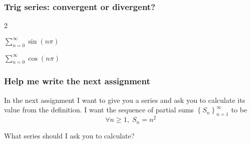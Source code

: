 \documentclass[14pt]{beamer}
\begin{document}
	\begin{frame}[t]
		\frametitle{Trig series: convergent or divergent?}

		\begin{enumerate}
		\end{enumerate}
	\end{frame}

	\begin{frame}[t]
		\frametitle{Help me write the next assignment}

		In the next assignment I want to give you a series and ask you to calculate
		its value from the definition. I want the sequence of partial sums $\displaystyle
		\left\{ S_{n}\right\}_{n=1}^{\infty}$ to be
		\[
			\forall n \geq 1, \; S_{n}= n^{2}
		\]

		What series should I ask you to calculate?
	\end{frame}
\end{document}
